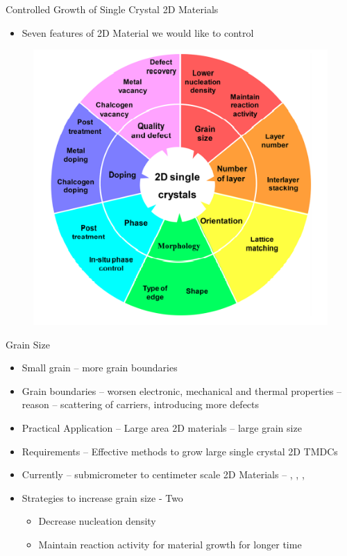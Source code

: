 \documentclass{beamer}
\begin{document}
\begin{frame}{Controlled Growth of Single Crystal 2D Materials}
    \begin{itemize}
        \item Seven features of 2D Material we would like to control
    \end{itemize}
    \begin{figure}
        \centering
        \includegraphics[scale = 0.7]{2D_material_features.PNG}
    \end{figure}
\end{frame}

\begin{frame}{Grain Size}
    \begin{itemize}
        \item Small grain -- more grain boundaries
        \item Grain boundaries -- worsen electronic, mechanical and thermal properties -- reason -- scattering of carriers, introducing more defects
        \item Practical Application -- Large area 2D materials -- large grain size
        \item Requirements -- Effective methods to grow large single crystal 2D TMDCs
        \item Currently -- submicrometer to centimeter scale 2D Materials -- , , , 
        \item Strategies to increase grain size - Two
        \begin{itemize}
            \item Decrease nucleation density
            \item Maintain reaction activity for material growth for longer time
        \end{itemize}
    \end{itemize}
\end{frame}
\end{document}
